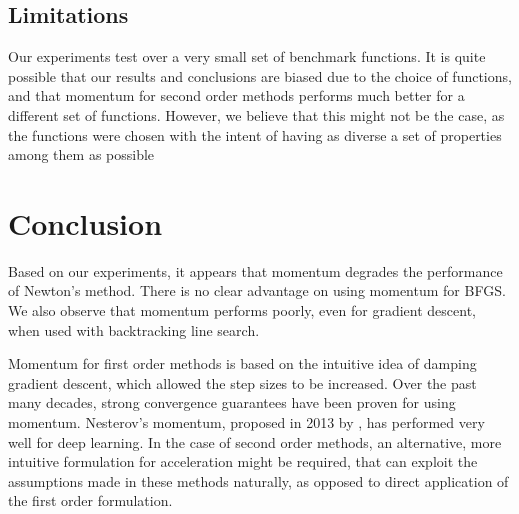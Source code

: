 \documentclass{article}
\begin{document}
\subsection{Limitations}
Our experiments test over a very small set of benchmark functions. It is quite possible that our results and conclusions are biased due to the choice of functions, and that momentum for second order methods performs much better for a different set of functions. However, we believe that this might not be the case, as the functions were chosen with the intent of having as diverse a set of properties among them as possible


\section{Conclusion}\label{conclusion}
Based on our experiments, it appears that momentum degrades the performance of Newton's method. There is no clear advantage on using momentum for BFGS. We also observe that momentum performs poorly, even for gradient descent, when used with backtracking line search.

Momentum for first order methods is based on the intuitive idea of damping gradient descent, which allowed the step sizes to be increased. Over the past many decades, strong convergence guarantees have been proven for using momentum. Nesterov's momentum, proposed in 2013 by \citet{Sutskever}, has performed very well for deep learning. In the case of second order methods, an alternative, more intuitive formulation for acceleration might be required, that can exploit the assumptions made in these methods naturally, as opposed to direct application of the first order formulation.




\end{document}
